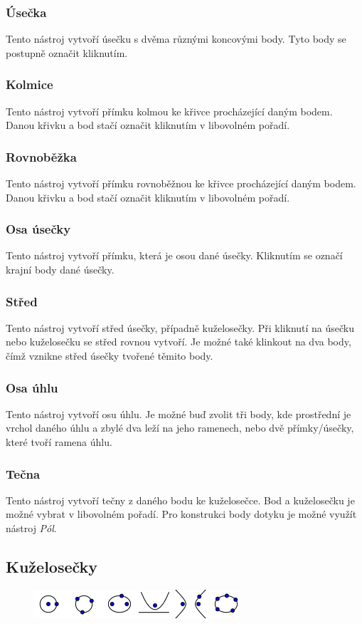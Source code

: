 \documentclass[11pt]{article}
\begin{document}
    \subsubsection{Úsečka}
    Tento nástroj vytvoří úsečku s dvěma různými koncovými body. Tyto body se postupně označit kliknutím.
    \subsubsection{Kolmice}
    Tento nástroj vytvoří přímku kolmou ke křivce procházející daným bodem. Danou křivku a bod stačí označit kliknutím v libovolném pořadí.
    \subsubsection{Rovnoběžka}
    Tento nástroj vytvoří přímku rovnoběžnou ke křivce procházející daným bodem. Danou křivku a bod stačí označit kliknutím v libovolném pořadí.
    \subsubsection{Osa úsečky}
    Tento nástroj vytvoří přímku, která je osou dané úsečky. Kliknutím se označí krajní body dané úsečky.
    \subsubsection{Střed}
    Tento nástroj vytvoří střed úsečky, případně kuželosečky. Při kliknutí na úsečku nebo kuželosečku se střed rovnou vytvoří. Je možné také klinkout na dva body, čímž vznikne střed úsečky tvořené těmito body.
    \subsubsection{Osa úhlu}
    Tento nástroj vytvoří osu úhlu. Je možné buď zvolit tři body, kde prostřední je vrchol daného úhlu a zbylé dva leží na jeho ramenech, nebo dvě přímky/úsečky, které tvoří ramena úhlu.
    \subsubsection{Tečna}
    Tento nástroj vytvoří tečny z daného bodu ke kuželosečce. Bod a kuželosečku je možné vybrat v libovolném pořadí. Pro konstrukci body dotyku je možné využít nástroj \textit{Pól}.

    \subsection{Kuželosečky}
    \vspace{-10pt}
    \begin{figure}[h]
        \begin{center}
        \includegraphics[scale=0.5]{imgs/conic_tools.png}
        \end{center}
    \end{figure}
    \vspace{-25pt}
\end{document}
